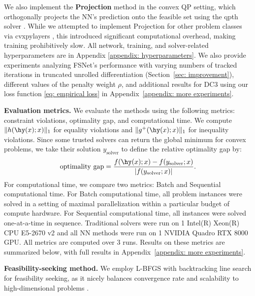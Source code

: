 \documentclass{article}
\def\x{x}
\begin{document}
We also implement the \textbf{Projection} method in the convex QP setting, which orthogonally projects the NN's prediction onto the feasible set using the qpth solver \cite{amos2017optnet}.
While we attempted to implement  Projection for other problem classes via cvxpylayers \cite{cvxpylayers2019}, this introduced significant computational overhead, making training prohibitively slow.
All network, training, and solver-related hyperparameters are in Appendix \ref{appendix: hyperparameters}.
We also provide experiments analyzing FSNet's performance with varying numbers of tracked iterations in truncated unrolled differentiation (Section~\ref{sec: improvement}), different values of the penalty weight $\rho$, and additional results for DC3 using our loss function \eqref{eq: empirical loss} in Appendix~\ref{appendix: more experiments}.


\textbf{Evaluation metrics.} 
We evaluate the methods using the following metrics: constraint violations, optimality gap, and computational time. 
We compute $\|h(\hy(\x);x)\|_1$ for equality violations and $\| g^+ (\hy(\x);x) \|_1$ for inequality violations. 
Since some trusted solvers can return the global minimum for convex problems, we take their solution $y_\mathrm{solver}$ to define the relative optimality gap by:
\begin{align*}
    \mathrm{optimality \,\, gap} = \frac{f(\hy(\x); \x) - f(y_\mathrm{solver}; x)}{\vert f(y_\mathrm{solver}; x) \vert}.
\end{align*}
For computational time, we compare two metrics: Batch and Sequential computational time.
For Batch computational time, all problem instances were solved in a setting of maximal parallelization within a particular budget of compute hardware. For Sequential computational time, all instances were solved one-at-a-time in sequence. Traditional solvers were run on 1 Intel(R) Xeon(R) CPU E5-2670 v2 and all NN methods were run on 1 NVIDIA Quadro RTX 8000 GPU. All metrics are computed over 3 runs.
Results on these metrics are summarized below, with full results in Appendix~\ref{appendix: more experiments}.

\textbf{Feasibility-seeking method.} We employ L-BFGS with backtracking line search for feasibility seeking, as it nicely balances convergence rate and scalability to high-dimensional problems \cite{nocedal1999numerical}. 
\end{document}
